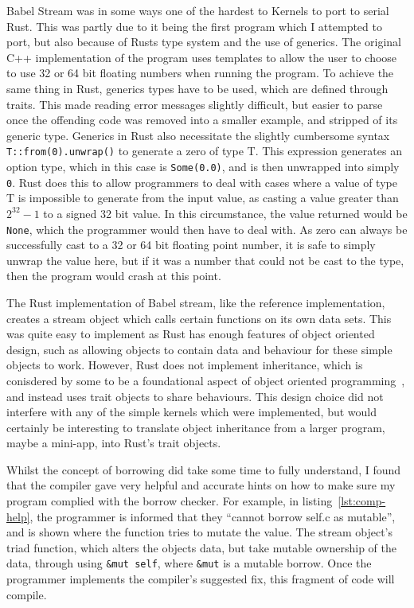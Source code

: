 Babel Stream was in some ways one of the hardest to Kernels to port to serial Rust. This was partly due to it being the first program which I attempted to port, but also because of Rusts type system and the use of generics. The original C++ implementation of the program uses templates to allow the user to choose to use 32 or 64 bit floating numbers when running the program. To achieve the same thing in Rust, generics types have to be used, which are defined through traits. This made reading error messages slightly difficult, but easier to parse once the offending code was removed into a smaller example, and stripped of its generic type. Generics in Rust also necessitate the slightly cumbersome syntax \texttt{T::from(0).unwrap()} to generate a zero of type T. This expression generates an option type, which in this case is \texttt{Some(0.0)}, and is then unwrapped into simply \texttt{0}. Rust does this to allow programmers to deal with cases where a value of type T is impossible to generate from the input value, as casting a value greater than $2^{32} - 1$ to a signed 32 bit value. In this circumstance, the value returned would be \texttt{None}, which the programmer would then have to deal with. As zero can always be successfully cast to a 32 or 64 bit floating point number, it is safe to simply unwrap the value here, but if it was a number that could not be cast to the type, then the program would crash at this point.

The Rust implementation of Babel stream, like the reference implementation, creates a stream object which calls certain functions on its own data sets. This was quite easy to implement as Rust has enough features of object oriented design, such as allowing objects to contain data and behaviour for these simple objects to work. However, Rust does not implement inheritance, which is conisdered by some to be a foundational aspect of object oriented programming~\cite{Liskov:1987}, and instead uses trait objects to share behaviours. This design choice did not interfere with any of the simple kernels which were implemented, but would certainly be interesting to translate object inheritance from a larger program, maybe a mini-app, into Rust's trait objects.

Whilst the concept of borrowing did take some time to fully understand, I found that the compiler gave very helpful and accurate hints on how to make sure my program complied with the borrow checker. For example, in listing~\ref{lst:comp-help}, the programmer is informed that they ``cannot borrow self.c as mutable'', and is shown where the function tries to mutate the value. The stream object's triad function, which alters the objects data, but take mutable ownership of the data, through using \texttt{\&mut self}, where \texttt{\&mut} is a mutable borrow. Once the programmer implements the compiler's suggested fix, this fragment of code will compile.

